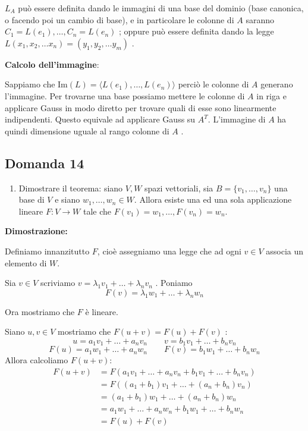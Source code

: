 \documentclass[
  a4paper,
]{article}
\providecommand{\tightlist}{%
  \setlength{\itemsep}{0pt}\setlength{\parskip}{0pt}}
\providecommand{\tightlist}{}
\begin{document}
\(L_A\) può essere definita dando le immagini di una base del dominio
(base canonica, o facendo poi un cambio di base), e in particolare le
colonne di \(A\) saranno \(C_1 = L(e_1), \dots, C_n = L(e_n)\) ; oppure
può essere definita dando la legge
\(L(x_1, x_2, \dots x_n) = (y_1, y_2, \dots y_m)\) .

\textbf{Calcolo dell'immagine}:

Sappiamo che \(\text{Im}(L) = \langle L(e_1), \dots ,L(e_n) \rangle\)
perciò le colonne di \(A\) generano l'immagine. Per trovarne una base
possiamo mettere le colonne di \(A\) in riga e applicare Gauss in modo
diretto per trovare quali di esse sono linearmente indipendenti. Questo
equivale ad applicare Gauss su \(A^T\). L'immagine di \(A\) ha quindi
dimensione uguale al rango colonne di \(A\) .

\hypertarget{domanda-14}{%
\subsection{Domanda 14}\label{domanda-14}}

\begin{observationbox}[Domanda]
\begin{enumerate}
\def\labelenumi{\arabic{enumi}.}
\setcounter{enumi}{13}
\tightlist
\item
  Dimostrare il teorema: siano \(V,W\) spazi vettoriali, sia
  \(B=\{v_1,\ldots,v_n\}\) una base di \(V\) e siano
  \(w_1,\ldots,w_n\in W\). Allora esiste una ed una sola applicazione
  lineare \(F:V\to W\) tale che \(F(v_1)=w_1,\ldots,F(v_n)=w_n\).
\end{enumerate}
\end{observationbox}

\textbf{Dimostrazione:}

Definiamo innanzitutto \(F\), cioè assegniamo una legge che ad ogni
\(v \in V\) associa un elemento di \(W\).

Sia \(v \in V\) scriviamo \(v = \lambda_1 v_1 + \dots + \lambda_n v_n\)
. Poniamo \[
F(v) = \lambda_1 w_1 + \dots + \lambda_n w_n
\]

Ora mostriamo che \(F\) è lineare.

Siano \(u, v \in V\) mostriamo che \(F(u + v) = F(u) + F(v)\) : \[
u = a_1 v_1 + \dots + a_n v_n \qquad v = b_1 v_1 + \dots + b_n v_n
\] \[
F(u) = a_1 w_1 + \dots + a_n w_n \qquad F(v) = b_1 w_1 + \dots + b_n w_n
\] Allora calcoliamo \(F(u + v)\): \[
\begin{aligned}
F(u + v) &= F(a_1 v_1 + \dots + a_n v_n + b_1 v_1 + \dots + b_n v_n) \\
&= F((a_1 + b_1) v_1 + \dots + (a_n + b_n) v_n) \\
&= (a_1 + b_1) w_1 + \dots + (a_n + b_n) w_n \\
&= a_1 w_1 + \dots + a_n w_n + b_1 w_1 + \dots + b_n w_n \\
&= F(u) + F(v)
\end{aligned}
\]
\end{document}
